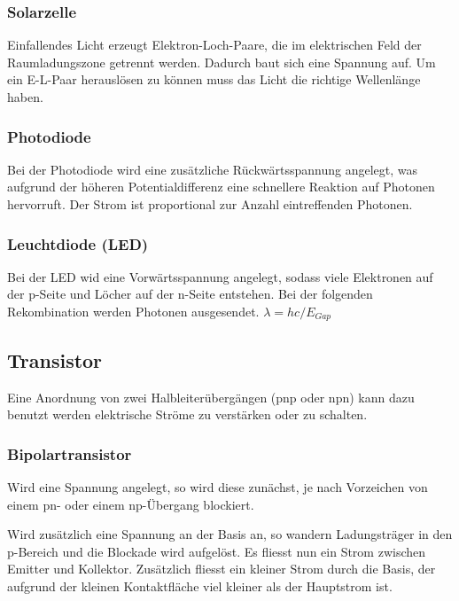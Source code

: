 \documentclass[10pt,a4paper]{scrartcl}
\begin{document}
\begin{multicols*}{3}
	\subsubsection{Solarzelle}
	
	Einfallendes Licht erzeugt Elektron-Loch-Paare, die im elektrischen Feld der Raumladungszone getrennt werden. Dadurch baut sich eine Spannung auf. Um ein E-L-Paar herauslösen zu können muss das Licht die richtige Wellenlänge haben. 
	
	
	
	\subsubsection{Photodiode}
	
	Bei der Photodiode wird eine zusätzliche Rückwärtsspannung angelegt, was aufgrund der höheren Potentialdifferenz eine schnellere Reaktion auf Photonen hervorruft. Der Strom ist proportional zur Anzahl eintreffenden Photonen.
	
	\subsubsection{Leuchtdiode (LED)}
	
	Bei der LED wid eine Vorwärtsspannung angelegt, sodass viele Elektronen auf der p-Seite und Löcher auf der n-Seite entstehen. Bei der folgenden Rekombination werden Photonen ausgesendet. $\lambda=hc/E_{Gap}$
	
	\subsection{Transistor}
	
	Eine Anordnung von zwei Halbleiterübergängen (pnp oder npn) kann dazu benutzt werden elektrische Ströme zu verstärken oder zu schalten.
	
	\subsubsection*{Bipolartransistor}
	
	
	Wird eine Spannung angelegt, so wird diese zunächst, je nach Vorzeichen von einem pn- oder einem np-Übergang blockiert.
	
	Wird zusätzlich eine Spannung an der Basis an, so wandern Ladungsträger in den p-Bereich und die Blockade wird aufgelöst. Es fliesst nun ein Strom zwischen Emitter und Kollektor. Zusätzlich fliesst ein kleiner Strom durch die Basis, der aufgrund der kleinen Kontaktfläche viel kleiner als der Hauptstrom ist. 
	

\end{multicols*}
\end{document}
